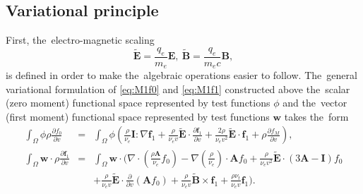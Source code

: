 \documentclass[review]{elsarticle}
\newcommand{\pdv}[2]{\frac{\partial{#1}}{\partial{#2}}}
\newcommand{\vect}[1]{\boldsymbol{#1}}
\newcommand{\matr}[1]{\mathbf{#1}}
\newcommand{\nue}{\nu_{e}}
\newcommand{\nutot}{\nu_{t}}
\newcommand{\vmag}{v}
\newcommand{\E}{\vect{E}}
\newcommand{\B}{\vect{B}}
\newcommand{\tE}{\vect{\tilde{E}}}
\newcommand{\tB}{\vect{\tilde{B}}}
\newcommand{\qe}{q_e}
\newcommand{\me}{m_e}
\newcommand{\fM}{f_M}
\newcommand{\fzero}{f_0}
\newcommand{\fone}{\vect{f}_1}
\newcommand{\MI}{\matr{I}}
\newcommand{\MA}{\matr{A}}
\newcommand{\intO}{\int_{\Omega}}
\begin{document}
\subsection{Variational principle}
First, the~electro-magnetic scaling
\begin{equation}
  \tE = \frac{\qe}{\me}\E,~\tB = \frac{\qe}{\me c} \B,
\end{equation}
is defined in order to make the~algebraic operations easier to follow.
The~general variational formulation of \eqref{eq:M1f0} and \eqref{eq:M1f1} 
constructed above the~scalar (zero moment) functional space
represented by test functions $\phi$ and the~vector
(first moment) functional space represented by test functions $\vect{w}$ 
takes the~form
\begin{eqnarray}
  \intO\phi\rho \pdv{\fzero}{\vmag} &=& 
  \intO\phi
  \left(\frac{\rho}{\nue}\MI:\nabla\fone + 
  \frac{\rho}{\nue\vmag}\tE\cdot\pdv{\fone}{\vmag}
  + \frac{2 \rho}{\nue\vmag^2}\tE\cdot\fone + \rho \pdv{\fM}{\vmag}\right) , 
  \label{eq:M1hosf0_variational}\\
  \intO\vect{w}\cdot\rho \pdv{\fone}{\vmag} &=&
  \intO\vect{w}\cdot\Bigg(\nabla\cdot\left(\frac{\rho\MA}{\nue}\fzero\right) 
  - \nabla\left( \frac{\rho}{\nue}\right)\cdot\MA\fzero 
  + \frac{\rho}{\nue\vmag^2}\tE\cdot\left( 3\MA - \MI \right)\fzero
  \nonumber\\
  && 
  + \frac{\rho}{\nue\vmag}\tE\cdot\pdv{}{\vmag}
  \left( \MA\fzero\right) + \frac{\rho}{\nue\vmag}\tB\times\fone + 
  \frac{\rho \nutot}{\nue\vmag}\fone\Bigg) .
  \label{eq:M1hosf1_variational}
\end{eqnarray}
\end{document}
